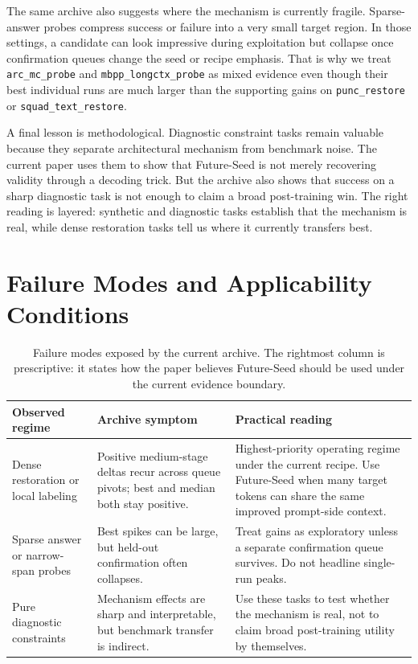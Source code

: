 \documentclass{article}
\begin{document}
The same archive also suggests where the mechanism is currently fragile. Sparse-answer probes compress success or failure into a very small target region. In those settings, a candidate can look impressive during exploitation but collapse once confirmation queues change the seed or recipe emphasis. That is why we treat \texttt{arc\_mc\_probe} and \texttt{mbpp\_longctx\_probe} as mixed evidence even though their best individual runs are much larger than the supporting gains on \texttt{punc\_restore} or \texttt{squad\_text\_restore}.

A final lesson is methodological. Diagnostic constraint tasks remain valuable because they separate architectural mechanism from benchmark noise. The current paper uses them to show that Future-Seed is not merely recovering validity through a decoding trick. But the archive also shows that success on a sharp diagnostic task is not enough to claim a broad post-training win. The right reading is layered: synthetic and diagnostic tasks establish that the mechanism is real, while dense restoration tasks tell us where it currently transfers best.

\section{Failure Modes and Applicability Conditions}
\begin{table}[t]
\centering
\small
\caption{Failure modes exposed by the current archive. The rightmost column is prescriptive: it states how the paper believes Future-Seed should be used under the current evidence boundary.}
\label{tab:failure-modes}
\begin{tabular}{p{}p{}p{}}
\toprule
Observed regime & Archive symptom & Practical reading \\
\midrule
Dense restoration or local labeling & Positive medium-stage deltas recur across queue pivots; best and median both stay positive. & Highest-priority operating regime under the current recipe. Use Future-Seed when many target tokens can share the same improved prompt-side context. \\
Sparse answer or narrow-span probes & Best spikes can be large, but held-out confirmation often collapses. & Treat gains as exploratory unless a separate confirmation queue survives. Do not headline single-run peaks. \\
Pure diagnostic constraints & Mechanism effects are sharp and interpretable, but benchmark transfer is indirect. & Use these tasks to test whether the mechanism is real, not to claim broad post-training utility by themselves. \\
\bottomrule
\end{tabular}
\end{table}
\end{document}
